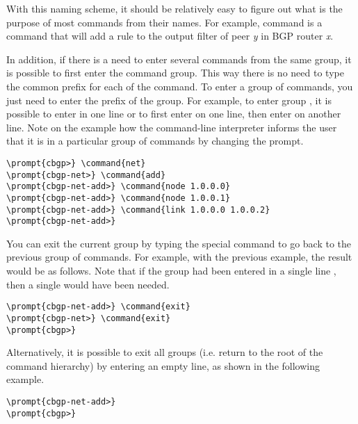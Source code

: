 With this naming scheme, it should be relatively easy to figure out
what is the purpose of most commands from their names. For example,
command 
is a command that will add a rule to the output filter of peer {\it y}
in BGP router {\it x}.

In addition, if there is a need to enter several commands from the
same group, it is possible to first enter the command group. This way
there is no need to type the common prefix for each of the command. To
enter a group of commands, you just need to enter the prefix of the
group. For example, to enter group , it is possible
to enter  in one line or to first enter 
on one line, then enter  on another line. Note on the
example how the command-line interpreter informs the user that it is
in a particular group of commands by changing the prompt.

\begin{Verbatim}[commandchars=\\\{\}]
\prompt{cbgp>} \command{net}
\prompt{cbgp-net>} \command{add}
\prompt{cbgp-net-add>} \command{node 1.0.0.0}
\prompt{cbgp-net-add>} \command{node 1.0.0.1}
\prompt{cbgp-net-add>} \command{link 1.0.0.0 1.0.0.2}
\prompt{cbgp-net-add>}
\end{Verbatim}

You can exit the current group by typing the special 
command to go back to the previous group of commands. For example,
with the previous example, the result would be as follows. Note that
if the group had been entered in a single line , then
a single  would have been needed.

\begin{Verbatim}[commandchars=\\\{\}]
\prompt{cbgp-net-add>} \command{exit}
\prompt{cbgp-net>} \command{exit}
\prompt{cbgp>} 
\end{Verbatim}

Alternatively, it is possible to exit all groups (i.e. return to the
root of the command hierarchy) by entering an empty line, as shown in
the following example.

\begin{Verbatim}[commandchars=\\\{\}]
\prompt{cbgp-net-add>}
\prompt{cbgp>} 
\end{Verbatim}


